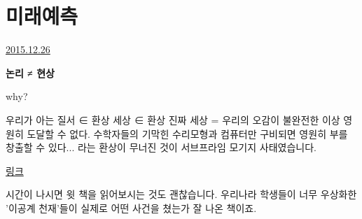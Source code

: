 \section{미래예측}
\href{https://www.kockoc.com/Apoc/564639}{2015.12.26}

\vspace{5mm}

\textbf{논리 ≠ 현상}
\vspace{5mm}

why?
\vspace{5mm}

우리가 아는 질서 ∈ 환상
세상 ∈ 환상
진짜 세상 = 우리의 오감이 불완전한 이상 영원히 도달할 수 없다.
수학자들의 기막힌 수리모형과 컴퓨터만 구비되면 영원히 부를 창출할 수 있다... 라는 환상이 무너진 것이
서브프라임 모기지 사태였습니다.
\vspace{5mm}

\href{http://www.aladin.co.kr/shop/wproduct.aspx?ItemId=12470584}{링크}
\vspace{5mm}

시간이 나시면 윗 책을 읽어보시는 것도 괜찮습니다.
우리나라 학생들이 너무 우상화한 '이공계 천재'들이 실제로 어떤 사건을 쳤는가 잘 나온 책이죠.
\vspace{5mm}

